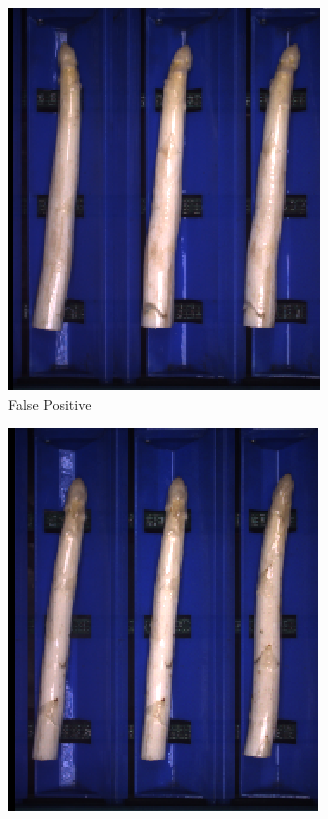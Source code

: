 \begin{figure}[h]
	\begin{subfigure}{0.3\textwidth}
		\includegraphics[width=0.9\linewidth]{Figures/appendix/flower_falsepositive_01.png}
		\vspace{-5pt} 
		\caption{False Positive}
	\end{subfigure}
	\begin{subfigure}{0.3\textwidth}
		\includegraphics[width=0.9\linewidth]{Figures/appendix/flower_falsepositive_02.png}

\end{subfigure}
\end{figure}
